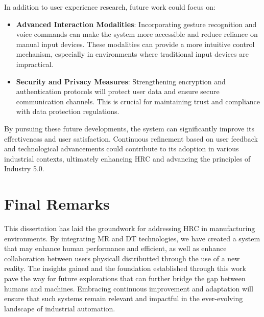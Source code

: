 In addition to user experience research, future work could focus on:

\begin{itemize} 

    \item \textbf{Advanced Interaction Modalities}: Incorporating gesture recognition and voice commands can make the system more accessible and reduce reliance on manual input devices. These modalities can provide a more intuitive control mechanism, especially in environments where traditional input devices are impractical.
    
    \item \textbf{Security and Privacy Measures}: Strengthening encryption and authentication protocols will protect user data and ensure secure communication channels. This is crucial for maintaining trust and compliance with data protection regulations.
\end{itemize}

By pursuing these future developments, the system can significantly improve its effectiveness and user satisfaction. Continuous refinement based on user feedback and technological advancements could contribute to its adoption in various industrial contexts, ultimately enhancing \ac{HRC} and advancing the principles of Industry 5.0.

\section{Final Remarks}

This dissertation has laid the groundwork for addressing \ac{HRC} in manufacturing environments. By integrating \ac{MR} and \ac{DT} technologies, we have created a system that may enhance human performance and efficient, as well as enhance collaboration between users physicall distributted through the use of a new reality. The insights gained and the foundation established through this work pave the way for future explorations that can further bridge the gap between humans and machines. Embracing continuous improvement and adaptation will ensure that such systems remain relevant and impactful in the ever-evolving landscape of industrial automation.
